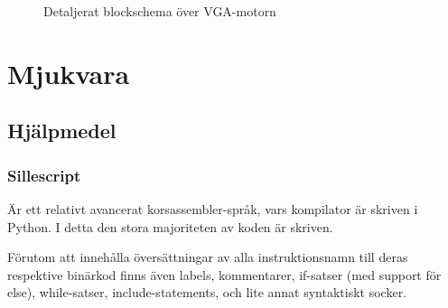 \documentclass[]{article}
\begin{document}
\begin{figure}[h!]
	\caption{Detaljerat blockschema över VGA-motorn}
\end{figure}

\newpage

\section{Mjukvara}

\subsection{Hjälpmedel}

\subsubsection{Sillescript}

Är ett relativt avancerat korsassembler-språk, vars kompilator är skriven i Python. I detta den stora majoriteten av koden är skriven.

Förutom att innehålla översättningar av alla instruktionsnamn till deras respektive binärkod finns även labels, kommentarer, if-satser (med support för else), while-satser, include-statements, och lite annat syntaktiskt socker.
\end{document}
